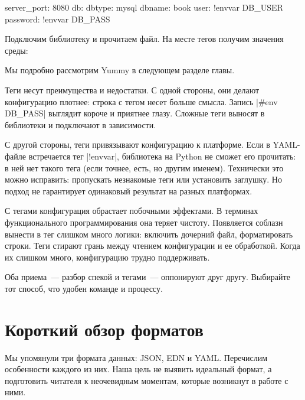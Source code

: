 \begin{english}
  \begin{yaml}
server_port: 8080
db:
  dbtype:   mysql
  dbname:   book
  user:     !envvar DB_USER
  password: !envvar DB_PASS
  \end{yaml}
\end{english}

Подключим библиотеку и прочитаем файл. На месте тегов получим значения среды:

\begin{english}
  \begin{clojure}
(require '[yummy.config :as yummy])
(yummy/load-config {:path "config.yaml"})

{:server_port 8080
 :db {:dbtype "mysql"
      :dbname "book"
      :user "ivan"
      :password "*(&fd}A53z#$!"}}
  \end{clojure}
\end{english}

\noindent
Мы подробно рассмотрим Yummy в следующем разделе главы.

Теги несут преимущества и недостатки. С одной стороны, они делают конфигурацию
плотнее: строка с тегом несет больше смысла. Запись \spverb|#env DB_PASS|
выглядит короче и приятнее глазу. Сложные теги выносят в библиотеки и подключают
в зависимости.

С другой стороны, теги привязывают конфигурацию к платформе. Если в YAML-файле
встречается тег \spverb|!envvar|, библиотека на Python не сможет его прочитать:
в ней нет такого тега (если точнее, есть, но другим именем). Технически это
можно исправить: пропускать незнакомые теги или установить заглушку. Но подход
не гарантирует одинаковый результат на разных платформах.

С тегами конфигурация обрастает побочными эффектами. В терминах функционального
программирования она теряет чистоту. Появляется соблазн вынести в тег слишком
много логики: включить дочерний файл, форматировать строки. Теги стирают грань
между чтением конфигурации и ее обработкой. Когда их слишком много, конфигурацию
трудно поддерживать.

Оба приема~--- разбор спекой и тегами~--- оппонируют друг другу. Выбирайте тот
способ, что удобен команде и процессу.

\section{Короткий обзор форматов}

Мы упомянули три формата данных: JSON, EDN и YAML. Перечислим особенности
каждого из них. Наша цель не выявить идеальный формат, а подготовить читателя к
неочевидным моментам, которые возникнут в работе с ними.

